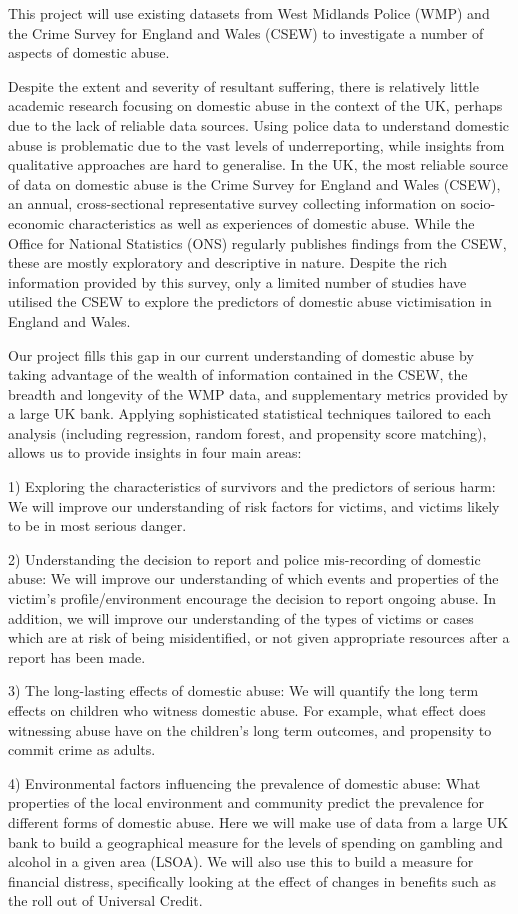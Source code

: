 This project will use existing datasets from West Midlands Police (WMP) and the Crime Survey for England and Wales (CSEW) to investigate a number of aspects of domestic abuse.

Despite the extent and severity of resultant suffering, there is relatively little academic research focusing on domestic abuse in the context of the UK, perhaps due to the lack of reliable data sources. Using police data to understand domestic abuse is problematic due to the vast levels of underreporting, while insights from qualitative approaches are hard to generalise. In the UK, the most reliable source of data on domestic abuse is the Crime Survey for England and Wales (CSEW), an annual, cross-sectional representative survey collecting information on socio-economic characteristics as well as experiences of domestic abuse.  While the Office for National Statistics (ONS) regularly publishes findings from the CSEW, these are mostly exploratory and descriptive in nature. Despite the rich information provided by this survey, only a limited number of studies have utilised the CSEW to explore the predictors of domestic abuse victimisation in England and Wales. 

Our project fills this gap in our current understanding of domestic abuse by taking advantage of the wealth of information contained in the CSEW, the breadth and longevity of the WMP data, and supplementary metrics provided by a large UK bank. Applying sophisticated statistical techniques tailored to each analysis (including regression, random forest, and propensity score matching), allows us to provide insights in four main areas:

1) Exploring the characteristics of survivors and the predictors of serious harm: We will improve our understanding of risk factors for victims, and victims likely to be in most serious danger.

2) Understanding the decision to report and police mis-recording of domestic abuse: We will improve our understanding of which events and properties of the victim’s profile/environment encourage the decision to report ongoing abuse. In addition, we will improve our understanding of the types of victims or cases which are at risk of being misidentified, or not given appropriate resources after a report has been made.

3) The long-lasting effects of domestic abuse: We will quantify the long term effects on children who witness domestic abuse. For example, what effect does witnessing abuse have on the children's long term outcomes, and propensity to commit crime as adults.

4) Environmental factors influencing the prevalence of domestic abuse: What properties of the local environment and community predict the prevalence for different forms of domestic abuse. Here we will make use of data from a large UK bank to build a geographical measure for the levels of spending on gambling and alcohol in a given area (LSOA). We will also use this to build a measure for financial distress, specifically looking at the effect of changes in benefits such as the roll out of Universal Credit.

